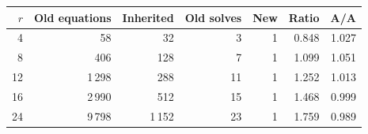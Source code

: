 \begin{center}
\small
\begin{tabular}{rrrrrrr}
\toprule
$r$ & Old equations & Inherited & Old solves & New & Ratio & A/A\\
\midrule
4 & 58 & 32 & 3 & 1 & 0.848 & 1.027\\
8 & 406 & 128 & 7 & 1 & 1.099 & 1.051\\
12 & 1\,298 & 288 & 11 & 1 & 1.252 & 1.013\\
16 & 2\,990 & 512 & 15 & 1 & 1.468 & 0.999\\
24 & 9\,798 & 1\,152 & 23 & 1 & 1.759 & 0.989\\
\bottomrule
\end{tabular}
\end{center}
